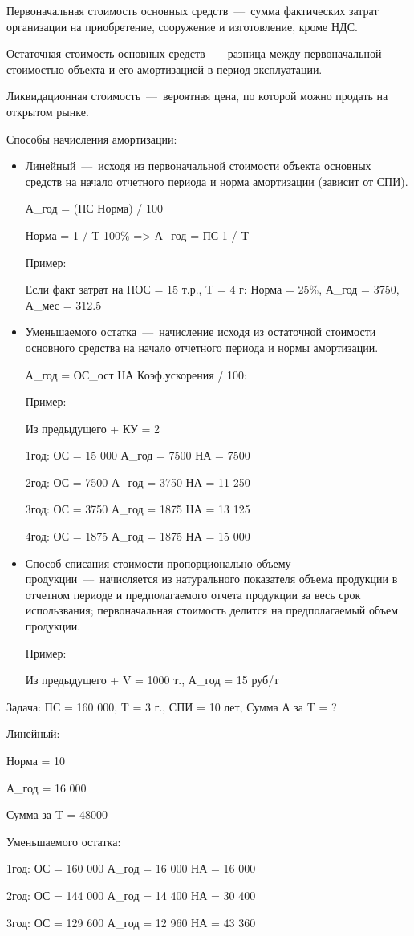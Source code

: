 \documentclass[14pt]{extarticle}
\begin{document}
Первоначальная стоимость основных средств~---~сумма фактических затрат организации на приобретение, сооружение и изготовление, кроме НДС.

Остаточная стоимость основных средств~---~разница между первоначальной стоимостью объекта и его амортизацией в период эксплуатации.

Ликвидационная стоимость~---~вероятная цена, по которой можно продать на открытом рынке.

Способы начисления амортизации:

\begin{itemize}
	\item Линейный~---~исходя из первоначальной стоимости объекта основных средств на начало отчетного периода и норма амортизации (зависит от СПИ).
	
        А\_год = (ПС  Норма) / 100
 
        Норма = 1 / T  100\% => А\_год = ПС  1 / T

        Пример:
        
        Если факт затрат на ПОС = 15 т.р., T = 4 г: Норма = 25\%, А\_год = 3750, А\_мес = 312.5
        
    \item Уменьшаемого остатка~---~начисление исходя из остаточной стоимости основного средства на начало отчетного периода и нормы амортизации.
    
        А\_год = ОС\_ост  НА  Коэф.ускорения / 100:
        
        Пример:
        
        Из предыдущего + КУ = 2
        
        1год: ОС = 15 000 А\_год = 7500 НА = 7500
        
        2год: ОС = 7500 А\_год = 3750 НА = 11 250
        
        3год: ОС = 3750 А\_год = 1875 НА = 13 125
        
        4год: ОС = 1875 А\_год = 1875 НА = 15 000
        
    \item Способ списания стоимости пропорционально объему продукции~---~начисляется из натурального показателя объема продукции в отчетном периоде и предполагаемого отчета продукции за весь срок использвания; первоначальная стоимость делится на предполагаемый объем продукции.
        
        Пример:
        
        Из предыдущего + V = 1000 т., А\_год = 15 руб/т
\end{itemize}

Задача: ПС = 160 000, T = 3 г., СПИ = 10 лет, Сумма А за T = ?

Линейный:

Норма = 10%

А\_год = 16 000

Сумма за T = 48000

Уменьшаемого остатка:

1год: ОС = 160 000 А\_год = 16 000 НА = 16 000

2год: ОС = 144 000 А\_год = 14 400 НА = 30 400

3год: ОС = 129 600 А\_год = 12 960 НА = 43 360
\end{document}

